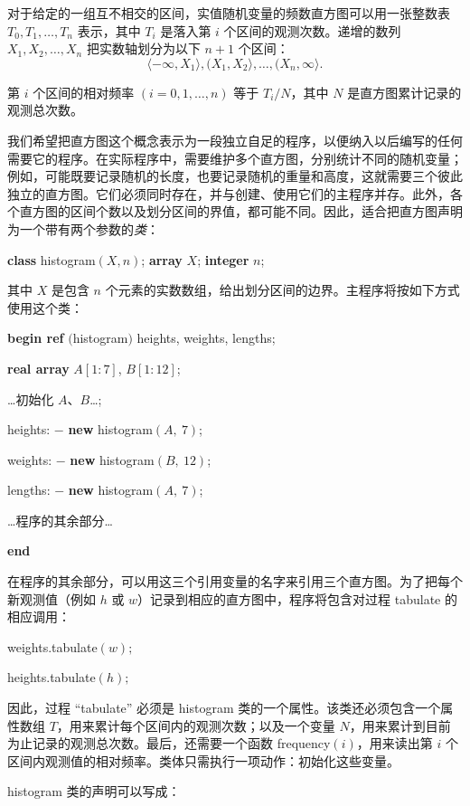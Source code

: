 \documentclass[twoside,11pt,fontset=none]{ctexbook}
\begin{document}
对于给定的一组互不相交的区间，实值随机变量的频数直方图可以用一张整数表 $T_0, T_1, \dots, T_n$ 表示，其中 $T_i$ 是落入第 $i$ 个区间的观测次数。递增的数列 $X_1, X_2, \dots, X_n$ 把实数轴划分为以下 $n + 1$ 个区间：
$$
\langle -\infty, X_1\rangle, (X_1, X_2\rangle, \dots, (X_n, \infty\rangle.
$$

\noindent
第 $i$ 个区间的相对频率 $(i = 0, 1, \dots, n)$ 等于 $T_i / N$，其中 $N$ 是直方图累计记录的观测总次数。

我们希望把直方图这个概念表示为一段独立自足的程序，以便纳入以后编写的任何需要它的程序。在实际程序中，需要维护多个直方图，分别统计不同的随机变量；例如，可能既要记录随机的长度，也要记录随机的重量和高度，这就需要三个彼此独立的直方图。它们必须同时存在，并与创建、使用它们的主程序并存。此外，各个直方图的区间个数以及划分区间的界值，都可能不同。因此，适合把直方图声明为一个带有两个参数的\textit{类}：

\quad \textbf{class} histogram$(X, n)$; \textbf{array} $X$; \textbf{integer} $n$;

\noindent
其中 $X$ 是包含 $n$ 个元素的实数数组，给出划分区间的边界。主程序将按如下方式使用这个类：

\quad \textbf{begin ref} $($histogram$)$ heights, weights, lengths;

\quad \quad \textbf{real array} $A[1:7]$, $B[1:12]$;

\quad \quad \dots 初始化 $A$、$B$\dots;

\quad \quad heights: $-$ \textbf{new} histogram$(A,\ 7)$;

\quad \quad weights: $-$ \textbf{new} histogram$(B,\ 12)$;

\quad \quad lengths: $-$ \textbf{new} histogram$(A,\ 7)$;

\quad \quad \dots 程序的其余部分\dots

\quad \textbf{end}

在程序的其余部分，可以用这三个引用变量的名字来引用三个直方图。为了把每个新观测值（例如 $h$ 或 $w$）记录到相应的直方图中，程序将包含对过程 tabulate 的相应调用：

\quad weights.tabulate$(w);$

\quad heights.tabulate$(h);$

\noindent
因此，过程 ``tabulate'' 必须是 histogram 类的一个属性。该类还必须包含一个属性数组 $T$，用来累计每个区间内的观测次数；以及一个变量 $N$，用来累计到目前为止记录的观测总次数。最后，还需要一个函数 frequency$(i)$，用来读出第 $i$ 个区间内观测值的相对频率。类体只需执行一项动作：初始化这些变量。

histogram 类的声明可以写成：
\end{document}
